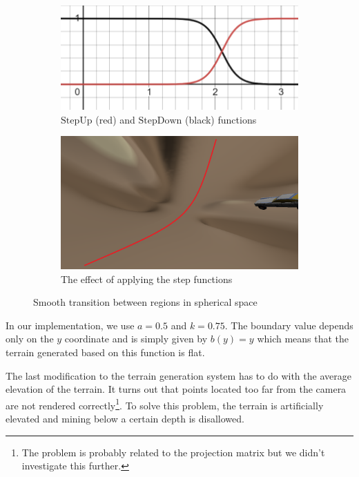\begin{figure}[!htb]
    \centering
    \begin{subfigure}[b]{0.475\textwidth}
        \centering
        \includegraphics[width=\textwidth]{chapters/problems/resources/step-functions.png}
        \caption[]%
        {{\small $\mathrm{StepUp}$ (red) and $\mathrm{StepDown}$ (black) functions}}
        \label{fig:step-functions}
    \end{subfigure}
    \hfill
    \begin{subfigure}[b]{0.475\textwidth}
        \centering
        \includegraphics[width=\textwidth]{chapters/problems/resources/boundary-flat.png}
        \caption[]%
        {{\small The effect of applying the step functions}}
        \label{fig:stiched-spheres}
    \end{subfigure}
    \caption[]
    {\small Smooth transition between regions in spherical space}
    \label{fig:stiching-spheres}
\end{figure}
In our implementation, we use $a = 0.5$ and $k = 0.75$.
The boundary value depends only on the $y$ coordinate and is simply given by $b(y) = y$ which means that the terrain generated based on this function is flat.

The last modification to the terrain generation system has to do with the average elevation of the terrain.
It turns out that points located too far from the camera are not rendered correctly\footnote{The problem is probably related to the projection matrix but we didn't investigate this further.}.
To solve this problem, the terrain is artificially elevated and mining below a certain depth is disallowed.